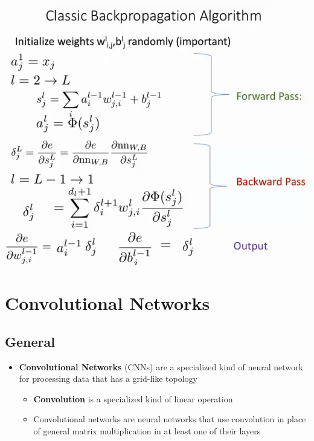 \documentclass[11pt]{article}
\begin{document}
\begin{center}
\includegraphics[width=.9\linewidth]{Deep Feedforward Networks/Screenshot-20181009084054-933x797_2018-10-09_08-41-57.png}
\end{center}

\section{Convolutional Networks}
\label{sec:org439882b}
\subsection{General}
\label{sec:orga4b0407}
\begin{itemize}
\item \textbf{Convolutional Networks} (CNNs) are a specialized kind of neural network for processing data that has a grid-like topology
\begin{itemize}
\item \textbf{Convolution} is a specialized kind of linear operation
\item Convolutional networks are neural networks that use convolution in place of general matrix multiplication in at least one of their layers
\end{itemize}
\end{itemize}
\end{document}
